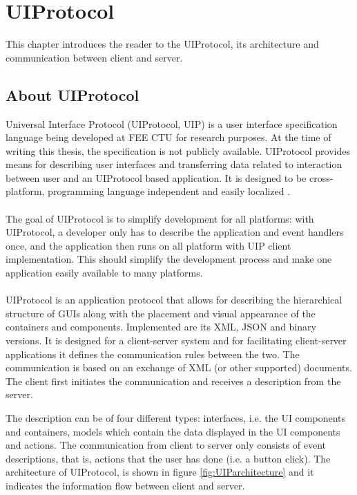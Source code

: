 \section{UIProtocol}
This chapter introduces the reader to the UIProtocol, its architecture and communication between client and server.

\subsection{About UIProtocol}
Universal Interface Protocol (UIProtocol, UIP) is a user interface specification language \cite{uip} being developed at FEE CTU for research purposes. At the time of writing this thesis, the specification is not publicly available. UIProtocol provides means for describing user interfaces and transferring data related to interaction between user and an UIProtocol based application. It is designed to be cross-platform, programming language independent and easily localized \cite{uip}.\\\\
The goal of UIProtocol is to simplify development for all platforms: with UIProtocol, a developer only has to describe the application and event handlers once, and the application then runs on all platform with UIP client implementation. This should simplify the development process and make one application easily available to many platforms.\\\\

UIProtocol is an application protocol that allows for describing the hierarchical structure of GUIs along with the placement and visual appearance of the containers and components. Implemented are its XML, JSON and binary versions. It is designed for a client-server system and for facilitating client-server applications it defines the communication rules between the two. The communication is based on an exchange of XML (or other supported) documents. The client first initiates the communication and receives a description from the server.

The description can be of four different types: interfaces, i.e. the UI components and containers, models which contain the data displayed in the UI components and actions. The communication from client to server only consists of event descriptions, that is, actions that the user has done (i.e. a button click). The architecture of UIProtocol, is shown in figure \ref{fig:UIParchitecture} and it indicates the information flow between client and server.


